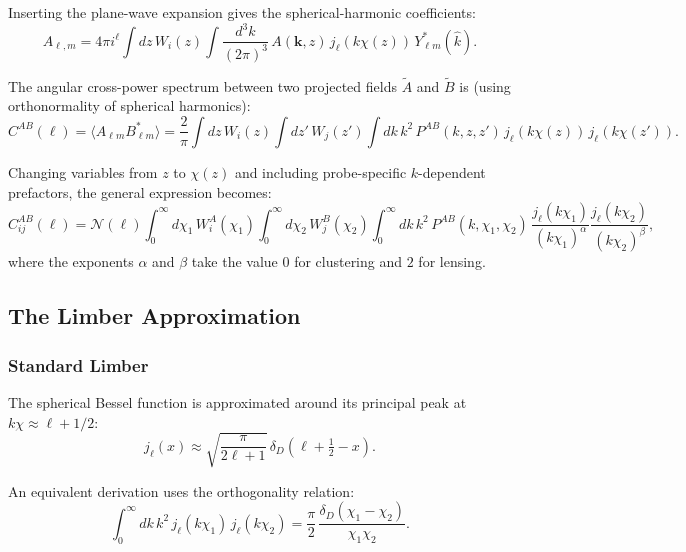 Inserting the plane-wave expansion gives the spherical-harmonic coefficients:
\begin{equation}
    A_{\ell,m} = 4\pi i^\ell \int dz\, W_i(z)
    \int \frac{d^3k}{(2\pi)^3}\, A(\mathbf{k},z)\,
    j_\ell(k\chi(z))\, Y^*_{\ell m}(\hat{k}).
\end{equation}

The angular cross-power spectrum between two projected fields $\tilde{A}$ and
$\tilde{B}$ is (using orthonormality of spherical harmonics):
\begin{equation}
    C^{AB}(\ell) = \langle A_{\ell m} B^*_{\ell m}\rangle =
    \frac{2}{\pi}
    \int dz\, W_i(z) \int dz'\, W_j(z')
    \int dk\, k^2\, P^{AB}(k,z,z')\,
    j_\ell(k\chi(z))\,j_\ell(k\chi(z')).
    \label{eq:Cl_general}
\end{equation}

Changing variables from $z$ to $\chi(z)$ and including probe-specific
$k$-dependent prefactors, the general expression becomes:
\begin{equation}
    C^{AB}_{ij}(\ell) = \mathcal{N}(\ell)
    \int_0^\infty d\chi_1\, W^A_i(\chi_1)
    \int_0^\infty d\chi_2\, W^B_j(\chi_2)
    \int_0^\infty dk\, k^2\, P^{AB}(k,\chi_1,\chi_2)\,
    \frac{j_\ell(k\chi_1)}{(k\chi_1)^\alpha}
    \frac{j_\ell(k\chi_2)}{(k\chi_2)^\beta},
    \label{eq:Cl_full}
\end{equation}
where the exponents $\alpha$ and $\beta$ take the value $0$ for clustering and
$2$ for lensing.

\subsection{The Limber Approximation}

\subsubsection{Standard Limber}

The spherical Bessel function is approximated around its principal peak at
$k\chi \approx \ell + 1/2$:
\begin{equation}
    j_\ell(x) \approx \sqrt{\frac{\pi}{2\ell+1}}\,\delta_D\!\left(\ell+\tfrac{1}{2}-x\right).
    \label{eq:limber_jl}
\end{equation}

An equivalent derivation uses the orthogonality relation:
\begin{equation}
    \int_0^\infty dk\, k^2\, j_\ell(k\chi_1)\,j_\ell(k\chi_2)
    = \frac{\pi}{2}\,\frac{\delta_D(\chi_1-\chi_2)}{\chi_1\chi_2}.
\end{equation}

